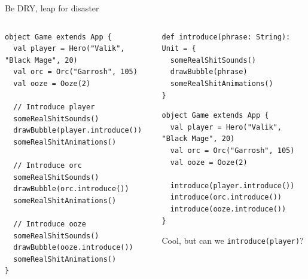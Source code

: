 \documentclass[presentation,aspectratio=169,smaller]{beamer}
\begin{document}
\begin{frame}[label={sec:orgea1c2c2},fragile]{Be DRY, leap for disaster}
 \begin{columns}
\begin{column}[t]{0.46\columnwidth}
\begin{verbatim}
object Game extends App {
  val player = Hero("Valik", "Black Mage", 20)
  val orc = Orc("Garrosh", 105)
  val ooze = Ooze(2)

  // Introduce player
  someRealShitSounds()
  drawBubble(player.introduce())
  someRealShitAnimations()

  // Introduce orc
  someRealShitSounds()
  drawBubble(orc.introduce())
  someRealShitAnimations()

  // Introduce ooze
  someRealShitSounds()
  drawBubble(ooze.introduce())
  someRealShitAnimations()
}
\end{verbatim}

\pause
\end{column}

\begin{column}[t]{0.46\columnwidth}
\begin{verbatim}
def introduce(phrase: String): Unit = {
  someRealShitSounds()
  drawBubble(phrase)
  someRealShitAnimations()
}
\end{verbatim}

\pause

\begin{verbatim}
object Game extends App {
  val player = Hero("Valik", "Black Mage", 20)
  val orc = Orc("Garrosh", 105)
  val ooze = Ooze(2)

  introduce(player.introduce())
  introduce(orc.introduce())
  introduce(ooze.introduce())
}
\end{verbatim}

\pause

Cool, but can we \texttt{introduce(player)}?
\end{column}
\end{columns}
\end{frame}
\end{document}
